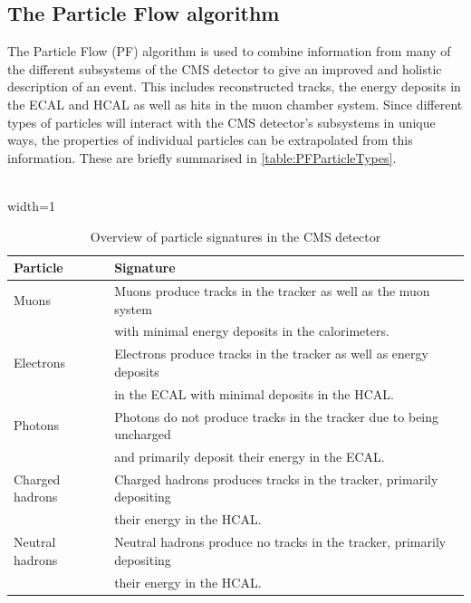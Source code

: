 \subsection{The Particle Flow algorithm}
The Particle Flow (PF) algorithm \cite{ParticleFlowCMS} is used to combine information from many of the different subsystems of the CMS detector to give an improved and holistic description of an event. This includes reconstructed tracks, the energy deposits in the ECAL and HCAL as well as hits in the muon chamber system. Since different types of particles will interact with the CMS detector's subsystems in unique ways, the properties of individual particles can be extrapolated from this information. These are briefly summarised in \autoref{table:PFParticleTypes}. \\
\\
\begin{table}[H]
    \centering
    \caption[]{Overview of particle signatures in the CMS detector}
    \begin{adjustbox}{width=1\textwidth}
    \label{table:PFParticleTypes}
        \begin{tabular}{l l}
        \toprule 
        \textbf{Particle} & \textbf{Signature} \\
        \midrule 
        \midrule
        Muons & Muons produce tracks in the tracker as well as the muon system \\
        & with minimal energy deposits in the calorimeters. \\
        \midrule
        Electrons & Electrons produce tracks in the tracker as well as energy deposits \\ 
        & in the ECAL with minimal deposits in the HCAL. \\
        \midrule
        Photons & Photons do not produce tracks in the tracker due to being uncharged \\
        & and primarily deposit their energy in the ECAL. \\
        \midrule
        Charged hadrons & Charged hadrons produces tracks in the tracker, primarily depositing \\
        & their energy in the HCAL. \\
        \midrule
        Neutral hadrons & Neutral hadrons produce no tracks in the tracker, primarily depositing \\
        & their energy in the HCAL. \\ 

        \bottomrule
        \end{tabular} 

    \end{adjustbox}
\end{table}
